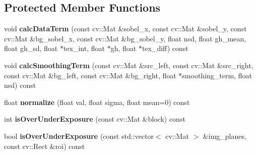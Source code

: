 \subsection*{Protected Member Functions}
\begin{DoxyCompactItemize}
\item 
\hypertarget{classskl_1_1_parallel_calc_edge_capacity_aaad1201111c178f9459ad6e111e33fc8}{}\label{classskl_1_1_parallel_calc_edge_capacity_aaad1201111c178f9459ad6e111e33fc8} 
void {\bfseries calc\+Data\+Term} (const cv\+::\+Mat \&sobel\+\_\+x, const cv\+::\+Mat \&sobel\+\_\+y, const cv\+::\+Mat \&bg\+\_\+sobel\+\_\+x, const cv\+::\+Mat \&bg\+\_\+sobel\+\_\+y, float nsd, float gh\+\_\+mean, float gh\+\_\+sd, float $\ast$tex\+\_\+int, float $\ast$gh, float $\ast$tex\+\_\+diff) const
\item 
\hypertarget{classskl_1_1_parallel_calc_edge_capacity_a80cce5c0ac677f00ef0dde521ee5e43f}{}\label{classskl_1_1_parallel_calc_edge_capacity_a80cce5c0ac677f00ef0dde521ee5e43f} 
void {\bfseries calc\+Smoothing\+Term} (const cv\+::\+Mat \&src\+\_\+left, const cv\+::\+Mat \&src\+\_\+right, const cv\+::\+Mat \&bg\+\_\+left, const cv\+::\+Mat \&bg\+\_\+right, float $\ast$smoothing\+\_\+term, float nsd) const
\item 
\hypertarget{classskl_1_1_parallel_calc_edge_capacity_acf7a71128e015c39b2024d193239eb6d}{}\label{classskl_1_1_parallel_calc_edge_capacity_acf7a71128e015c39b2024d193239eb6d} 
float {\bfseries normalize} (float val, float sigma, float mean=0) const
\item 
\hypertarget{classskl_1_1_parallel_calc_edge_capacity_aadec181a33ea4e8d7b3c553c8746fb3a}{}\label{classskl_1_1_parallel_calc_edge_capacity_aadec181a33ea4e8d7b3c553c8746fb3a} 
int {\bfseries is\+Over\+Under\+Exposure} (const cv\+::\+Mat \&block) const
\item 
\hypertarget{classskl_1_1_parallel_calc_edge_capacity_ae4285b3c3516981a41e41971fb7e3bec}{}\label{classskl_1_1_parallel_calc_edge_capacity_ae4285b3c3516981a41e41971fb7e3bec} 
bool {\bfseries is\+Over\+Under\+Exposure} (const std\+::vector$<$ cv\+::\+Mat $>$ \&img\+\_\+planes, const cv\+::\+Rect \&roi) const
\end{DoxyCompactItemize}
